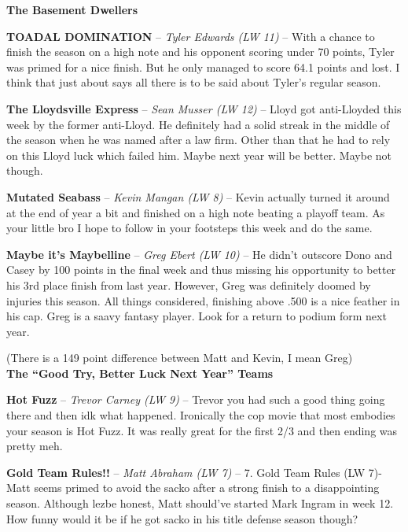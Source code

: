 \documentclass[11pt,letterpaper]{article}
\begin{document}
\newpage
{}
\textbf{The Basement Dwellers}
\begin{etaremune}
\setcounter{enumi}{13}
\item \textbf{TOADAL DOMINATION} -- \textit{Tyler Edwards (LW 11)} -- With a chance to finish the season on a high note and his opponent scoring under 70 points, Tyler was primed for a nice finish. But he only managed to score 64.1 points and lost. I think that just about says all there is to be said about Tyler's regular season.
\item \textbf{The Lloydsville Express} -- \textit{Sean Musser (LW 12)} -- Lloyd got anti-Lloyded this week by the former anti-Lloyd. He definitely had a solid streak in the middle of the season when he was named after a law firm. Other than that he had to rely on this Lloyd luck which failed him. Maybe next year will be better. Maybe not though. 
\item \textbf{Mutated Seabass} -- \textit{Kevin Mangan (LW 8)} -- Kevin actually turned it around at the end of year a bit and finished on a high note beating a playoff team. As your little bro I hope to follow in your footsteps this week and do the same.  
\item \textbf{Maybe it's Maybelline} -- \textit{Greg Ebert (LW 10)} -- He didn't outscore Dono and Casey by 100 points in the final week and thus missing his opportunity to better his 3rd place finish from last year. However, Greg was definitely doomed by injuries this season. All things considered, finishing above .500 is a nice feather in his cap. Greg is a saavy fantasy player. Look for a return to podium form next year. 
\end{etaremune}
(There is a 149 point difference between Matt and Kevin, I mean Greg)
\\\textbf{The ``Good Try, Better Luck Next Year'' Teams }
\begin{etaremune}
\setcounter{enumi}{9}
\item \textbf{Hot Fuzz} -- \textit{Trevor Carney (LW 9)} -- Trevor you had such a good thing going there and then idk what happened. Ironically the cop movie that most embodies your season is Hot Fuzz. It was really great for the first 2/3 and then ending was pretty meh. 
\item \textbf{Gold Team Rules!!} -- \textit{Matt Abraham (LW 7)} -- 7. Gold Team Rules (LW 7)-Matt seems primed to avoid the sacko after a strong finish to a disappointing season. Although lezbe honest, Matt should've started Mark Ingram in week 12. How funny would it be if he got sacko in his title defense season though? 
\end{etaremune}
\end{document}
